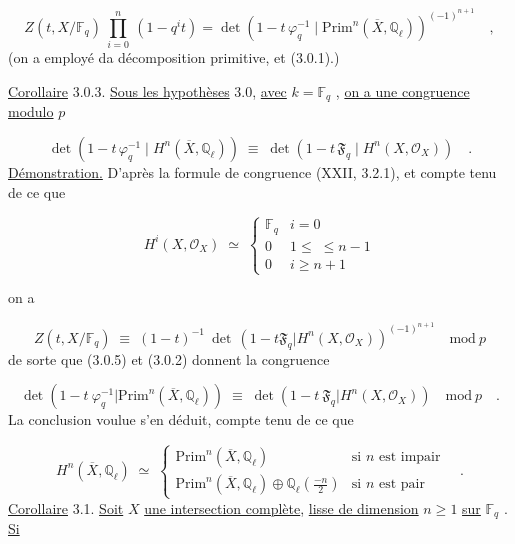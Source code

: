 \begin{equation}\tag{3.0.2}
Z(t,X/\mathbb{F}_q) \ \prod_{i=0}^{n} \ (1-q^i t) = \det(1-t\,\varphi_q^{-1} \mid \mathrm{Prim}^n(\overline{X},\mathbb{Q}_\ell))^{(-1)^{n+1}} \quad ,
\end{equation}
(on a employé da décomposition primitive, et (3.0.1).)

\underline{Corollaire} 3.0.3. \underline{Sous les hypothèses} 3.0, \underline{avec} $k = \mathbb{F}_q$ , \underline{on a une congruence modulo} $p$

\begin{equation*}
\det(1-t\,\varphi_q^{-1} \mid H^n(\overline{X},\mathbb{Q}_\ell)) \;\equiv\; \det(1-t\,\mathfrak{F}_q \mid H^n(X,\mathcal{O}_X)) \quad .
\end{equation*}
\underline{Démonstration.} D'après la formule de congruence (XXII, 3.2.1), et compte tenu de ce que

\begin{equation}\tag{3.0.4}
H^i(X,\mathcal{O}_X) \;\simeq\; \left\{ \begin{array}{ll} \mathbb{F}_q & i = 0 \\[1.5ex] 0 & 1 \leq \; \leq n - 1 \\[1.5ex] 0 & i \geq n+1 \end{array} \right.
\end{equation}

on a

\begin{equation}\tag{3.0.5}
Z(t,X/\mathbb{F}_q) \;\equiv\; (1-t)^{-1}\ \det\,(1-t\mathfrak{F}_q|H^n(X,\mathcal{O}_X))^{(-1)^{n+1}} \quad \mathrm{mod}\ p
\end{equation}
de sorte que (3.0.5) et (3.0.2) donnent la congruence

\begin{equation}\tag{3.0.6}
\det(1-t\ \varphi_q^{-1}|\mathrm{Prim}^n(\overline{X},\mathbb{Q}_\ell)) \;\equiv\; \det(1-t\ \mathfrak{F}_q|H^n(X,\mathcal{O}_X)) \quad \mathrm{mod}\ p \quad .
\end{equation}
La conclusion voulue s'en déduit, compte tenu de ce que

\begin{equation}\tag{3.0.7}
H^n(\overline{X},\mathbb{Q}_\ell) \;\simeq\; \begin{cases} \mathrm{Prim}^n(\overline{X},\mathbb{Q}_\ell) & \text{si } n \text{ est impair} \\[2mm] \mathrm{Prim}^n(\overline{X},\mathbb{Q}_\ell) \oplus \mathbb{Q}_\ell\!\left(\frac{-n}{2}\right) & \text{si } n \text{ est pair} \end{cases} \quad .
\end{equation}
\underline{Corollaire} 3.1. \underline{Soit} $X$ \underline{une intersection complète}, \underline{lisse de dimension} $n \geq 1$ \underline{sur} $\mathbb{F}_q$ . \underline{Si}

